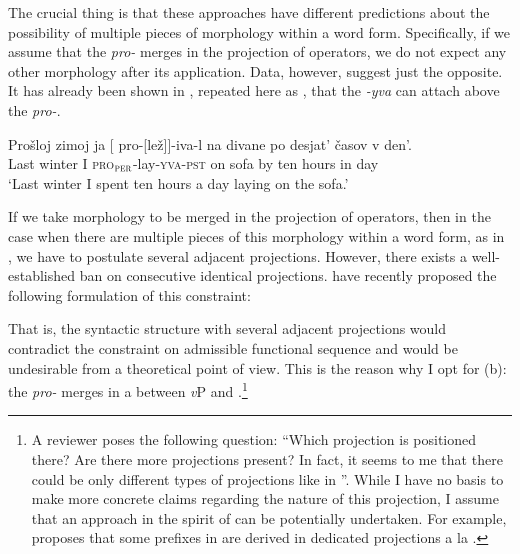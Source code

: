 \documentclass[output=paper,colorlinks,citecolor=brown,newtxmath]{langsci/langscibook}
\begin{document}
The crucial thing is that these approaches have different predictions about the possibility of multiple pieces of  morphology within a word form. Specifically, if we assume that the  \textit{pro-} merges in the projection of  operators, we do not expect any other  morphology after its application. Data, however, suggest just the opposite. It has already been shown in , repeated here as , that the  \textit{-yva} can attach above the  \textit{pro-}.

\ea \label{ex:naumov:19}
\gll Prošloj	zimoj	ja	[\hspace{-2pt} pro-[lež]]-iva-l	   na	divane	   po	desjat’ časov	v	den’. \\
Last	winter	I   {}	\textsc{pro}$_\textsc{per}$-lay-\textsc{yva}-\textsc{pst}	   on	sofa	   by	ten hours	in	day \\
\glt `Last winter I spent ten hours a day laying on the sofa.'
\z

\noindent If we take  morphology to be merged in the projection of  operators, then in the case when there are multiple pieces of this morphology within a word form, as in , we have to postulate several adjacent  projections. However, there exists a well-established ban on consecutive identical projections. \citet{de2018negation} have recently proposed the following formulation of this constraint:

\z

\noindent That is, the syntactic structure with several adjacent  projections would contradict the constraint on admissible functional sequence and would be undesirable from a theoretical point of view. This is the reason why I opt for (b): the  \textit{pro-} merges in a  between \textit{v}P and .\footnote{A reviewer poses the following question: ``Which projection is positioned there? Are there more projections present? In fact, it seems to me that there could be only different types of  projections like in \citet{cinque1999}''. While I have no basis to make more concrete claims regarding the nature of this projection, I assume that an approach in the spirit of \citet{cinque1999} can be potentially undertaken. For example, \citet{markova2011} proposes that some prefixes in  are derived in dedicated  projections a la \citet{cinque1999}.}
\end{document}
